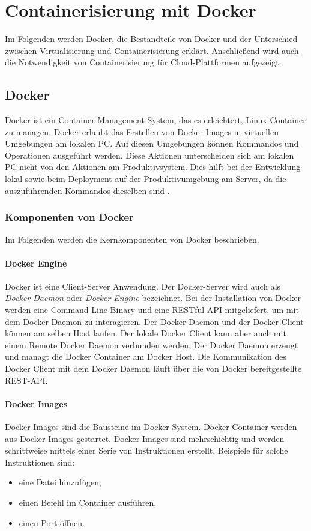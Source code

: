 \chapter{Containerisierung mit Docker}
Im Folgenden werden Docker, die Bestandteile von Docker und der Unterschied zwischen Virtualisierung und Containerisierung erklärt.
Anschließend wird auch die Notwendigkeit von Containerisierung für Cloud-Plattformen aufgezeigt.

\section{Docker}
Docker ist ein Container-Management-System, das es erleichtert, Linux Container zu managen. Docker erlaubt das Erstellen von Docker Images in virtuellen Umgebungen am lokalen PC. Auf diesen Umgebungen können Kommandos und Operationen ausgeführt werden. Diese Aktionen unterscheiden sich am lokalen PC nicht von den Aktionen am Produktivsystem. Dies hilft bei der Entwicklung lokal sowie beim Deployment auf der Produktivumgebung am Server, da die auszuführenden Kommandos dieselben sind \cite{MasteringDocker}.

\subsection{Komponenten von Docker}
Im Folgenden werden die Kernkomponenten von Docker beschrieben.

\subsubsection{Docker Engine}
Docker ist eine Client-Server Anwendung. Der Docker-Server wird auch als \textit{Docker Daemon} oder \textit{Docker Engine} bezeichnet. Bei der Installation von Docker werden eine Command Line Binary und eine RESTful API mitgeliefert, um mit dem Docker Daemon zu interagieren. Der Docker Daemon und der Docker Client können am selben Host laufen. Der lokale Docker Client kann aber auch mit einem Remote Docker Daemon verbunden werden.
Der Docker Daemon erzeugt und managt die Docker Container am Docker Host. Die Kommunikation des Docker Client mit dem Docker Daemon läuft über die von Docker bereitgestellte REST-API. \cite{TheDockerBook}

\subsubsection{Docker Images}
Docker Images sind die Bausteine im Docker System. Docker Container werden aus Docker Images gestartet. Docker Images sind mehrschichtig und werden schrittweise mittels einer Serie von Instruktionen erstellt.
Beispiele für solche Instruktionen sind:
\begin{itemize}
	\item eine Datei hinzufügen,
	\item einen Befehl im Container ausführen,
	\item einen Port öffnen.
\end{itemize}

